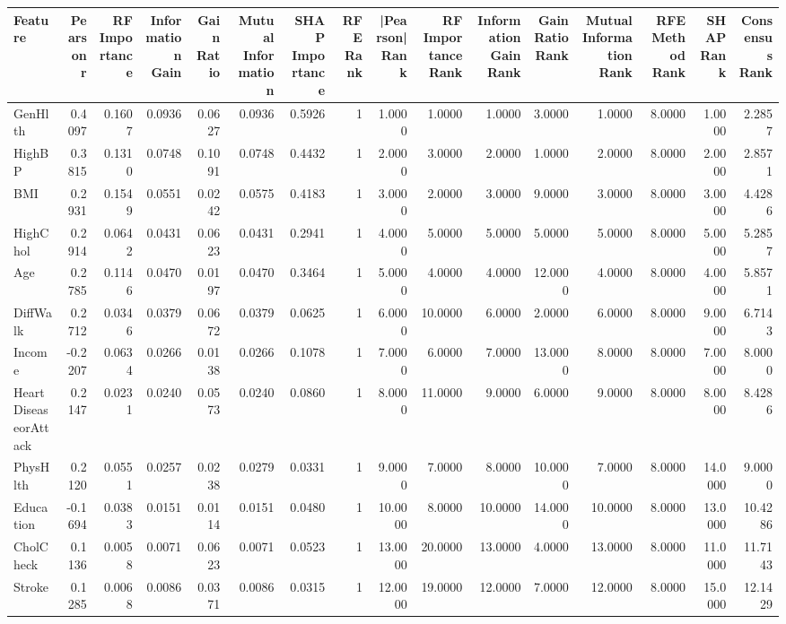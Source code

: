 \begin{tabular}{lrrrrrrrrrrrrrrr}
\toprule
Feature & Pearson r & RF Importance & Information Gain & Gain Ratio & Mutual Information & SHAP Importance & RFE Rank & |Pearson| Rank & RF Importance Rank & Information Gain Rank & Gain Ratio Rank & Mutual Information Rank & RFE Method Rank & SHAP Rank & Consensus Rank \\
\midrule
GenHlth & 0.4097 & 0.1607 & 0.0936 & 0.0627 & 0.0936 & 0.5926 & 1 & 1.0000 & 1.0000 & 1.0000 & 3.0000 & 1.0000 & 8.0000 & 1.0000 & 2.2857 \\
HighBP & 0.3815 & 0.1310 & 0.0748 & 0.1091 & 0.0748 & 0.4432 & 1 & 2.0000 & 3.0000 & 2.0000 & 1.0000 & 2.0000 & 8.0000 & 2.0000 & 2.8571 \\
BMI & 0.2931 & 0.1549 & 0.0551 & 0.0242 & 0.0575 & 0.4183 & 1 & 3.0000 & 2.0000 & 3.0000 & 9.0000 & 3.0000 & 8.0000 & 3.0000 & 4.4286 \\
HighChol & 0.2914 & 0.0642 & 0.0431 & 0.0623 & 0.0431 & 0.2941 & 1 & 4.0000 & 5.0000 & 5.0000 & 5.0000 & 5.0000 & 8.0000 & 5.0000 & 5.2857 \\
Age & 0.2785 & 0.1146 & 0.0470 & 0.0197 & 0.0470 & 0.3464 & 1 & 5.0000 & 4.0000 & 4.0000 & 12.0000 & 4.0000 & 8.0000 & 4.0000 & 5.8571 \\
DiffWalk & 0.2712 & 0.0346 & 0.0379 & 0.0672 & 0.0379 & 0.0625 & 1 & 6.0000 & 10.0000 & 6.0000 & 2.0000 & 6.0000 & 8.0000 & 9.0000 & 6.7143 \\
Income & -0.2207 & 0.0634 & 0.0266 & 0.0138 & 0.0266 & 0.1078 & 1 & 7.0000 & 6.0000 & 7.0000 & 13.0000 & 8.0000 & 8.0000 & 7.0000 & 8.0000 \\
HeartDiseaseorAttack & 0.2147 & 0.0231 & 0.0240 & 0.0573 & 0.0240 & 0.0860 & 1 & 8.0000 & 11.0000 & 9.0000 & 6.0000 & 9.0000 & 8.0000 & 8.0000 & 8.4286 \\
PhysHlth & 0.2120 & 0.0551 & 0.0257 & 0.0238 & 0.0279 & 0.0331 & 1 & 9.0000 & 7.0000 & 8.0000 & 10.0000 & 7.0000 & 8.0000 & 14.0000 & 9.0000 \\
Education & -0.1694 & 0.0383 & 0.0151 & 0.0114 & 0.0151 & 0.0480 & 1 & 10.0000 & 8.0000 & 10.0000 & 14.0000 & 10.0000 & 8.0000 & 13.0000 & 10.4286 \\
CholCheck & 0.1136 & 0.0058 & 0.0071 & 0.0623 & 0.0071 & 0.0523 & 1 & 13.0000 & 20.0000 & 13.0000 & 4.0000 & 13.0000 & 8.0000 & 11.0000 & 11.7143 \\
Stroke & 0.1285 & 0.0068 & 0.0086 & 0.0371 & 0.0086 & 0.0315 & 1 & 12.0000 & 19.0000 & 12.0000 & 7.0000 & 12.0000 & 8.0000 & 15.0000 & 12.1429 \\

\end{tabular}
